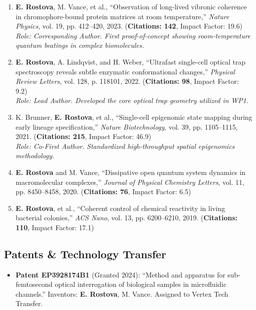 \documentclass[11pt,a4paper]{article}
\begin{document}
\begin{enumerate}[label={\lbrack \arabic* \rbrack}, leftmargin=2.5em, itemsep=6pt]
  \item \textbf{E. Rostova}, M. Vance, et al., ``Observation of long-lived vibronic coherence in chromophore-bound protein matrices at room temperature,'' \textit{Nature Physics}, vol. 19, pp. 412--420, 2023. \hfill (\textbf{Citations: 142}, Impact Factor: 19.6) \\
  \small \textit{Role: Corresponding Author. First proof-of-concept showing room-temperature quantum beatings in complex biomolecules.}

  \item \textbf{E. Rostova}, A. Lindqvist, and H. Weber, ``Ultrafast single-cell optical trap spectroscopy reveals subtle enzymatic conformational changes,'' \textit{Physical Review Letters}, vol. 128, p. 118101, 2022. \hfill (\textbf{Citations: 98}, Impact Factor: 9.2) \\
  \small \textit{Role: Lead Author. Developed the core optical trap geometry utilized in WP1.}

  \item K. Brunner, \textbf{E. Rostova}, et al., ``Single-cell epigenomic state mapping during early lineage specification,'' \textit{Nature Biotechnology}, vol. 39, pp. 1105--1115, 2021. \hfill (\textbf{Citations: 215}, Impact Factor: 46.9) \\
  \small \textit{Role: Co-First Author. Standardized high-throughput spatial epigenomics methodology.}

  \item \textbf{E. Rostova} and M. Vance, ``Dissipative open quantum system dynamics in macromolecular complexes,'' \textit{Journal of Physical Chemistry Letters}, vol. 11, pp. 8450--8458, 2020. \hfill (\textbf{Citations: 76}, Impact Factor: 6.5)

  \item \textbf{E. Rostova}, et al., ``Coherent control of chemical reactivity in living bacterial colonies,'' \textit{ACS Nano}, vol. 13, pp. 6200--6210, 2019. \hfill (\textbf{Citations: 110}, Impact Factor: 17.1)
\end{enumerate}

\subsection*{Patents \& Technology Transfer}
\begin{itemize}[leftmargin=1.5em]
  \item \textbf{Patent EP3928174B1} (Granted 2024): ``Method and apparatus for sub-femtosecond optical interrogation of biological samples in microfluidic channels.'' Inventors: \textbf{E. Rostova}, M. Vance. Assigned to Vertex Tech Transfer.
\end{itemize}
\end{document}
